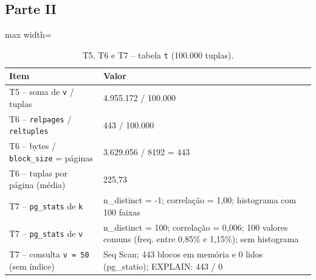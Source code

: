 \documentclass[11pt,a4paper]{article}
\begin{document}
\subsection*{Parte II}
\begin{table}[H]\centering\small
\caption{T5, T6 e T7 -- tabela \texttt{t} (100.000 tuplas).}\label{tab:t567}
\begin{adjustbox}{max width=\linewidth}\begin{tabular}{lp{9.2cm}}
\toprule
Item & Valor \\
\midrule
T5 -- soma de \texttt{v} / tuplas & 4.955.172 / 100.000 \\
T6 -- \texttt{relpages} / \texttt{reltuples} & 443 / 100.000 \\
T6 -- bytes / \texttt{block\_size} = páginas & 3.629.056 / 8192 = 443 \\
T6 -- tuplas por página (média) & 225,73 \\
T7 -- \texttt{pg\_stats} de \texttt{k} & n\_distinct = -1; correlação = 1,00; histograma com 100 faixas \\
T7 -- \texttt{pg\_stats} de \texttt{v} & n\_distinct = 100; correlação = 0,006; 100 valores comuns (freq. entre 0,85\% e 1,15\%); sem histograma \\
T7 -- consulta \texttt{v = 50} (sem índice) & Seq Scan; 443 blocos em memória e 0 lidos (pg\_statio); EXPLAIN: 443 / 0 \\
\bottomrule
\end{tabular}\end{adjustbox}
\end{table}
\end{document}
